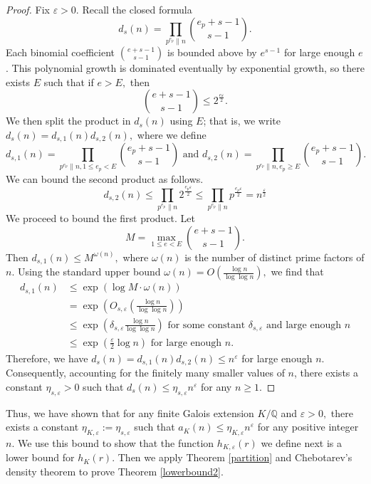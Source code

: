 \documentclass[12pt]{amsart}
\theoremstyle{definition}
\numberwithin{equation}{section}
\newcommand{\Q}{\mathbb{Q}}
\begin{document}
\begin{proof}
    Fix $\varepsilon > 0.$ Recall the closed formula $$d_s(n) = \prod_{p^{e_p} \|n} \binom{e_p+s-1}{s-1}.$$ Each binomial coefficient $\binom{e+s-1}{s-1}$ is bounded above by $e^{s-1}$ for large enough $e$. This polynomial growth is dominated eventually by exponential growth, so there exists $E$ such that if $e > E,$ then $$\binom{e+s-1}{s-1} \leq 2^{\frac{e \varepsilon}{2}}.$$ We then split the product in $d_s(n)$ using $E$; that is, we write $d_s(n) = d_{s,1}(n) d_{s,2}(n),$ where we define $$d_{s,1}(n) = \prod_{p^{e_p} \|n, 1 \leq e_p < E} \binom{e_p+s-1}{s-1} \text{ and }d_{s,2}(n) = \prod_{p^{e_p} \|n, e_p \geq E} \binom{e_p+s-1}{s-1}.$$ We can bound the second product as follows. $$d_{s,2}(n) \leq \prod_{p^{e_p} \| n} 2^\frac{e_p \varepsilon}{2} \leq \prod_{p^{e_p} \| n} p^\frac{e_p \varepsilon}{2} = n^\frac{\varepsilon}{2}$$ We proceed to bound the first product. Let $$M = \max_{1 \leq e < E} \binom{e+s-1}{s-1}.$$ Then $d_{s,1}(n) \leq M^{\omega(n)},$ where $\omega(n)$ is the number of distinct prime factors of $n$. Using the standard upper bound $\omega(n) = O(\frac{\log n}{\log \log n}),$ we find that 
    \begin{align*}
        d_{s,1}(n) & \leq \exp(\log M \cdot \omega(n)) \\
        &= \exp\left( O_{s, \varepsilon} \left( \frac{\log n}{\log \log n}\right)\right) \\
        &\leq \exp\left( \delta_{s, \varepsilon} \frac{\log n}{\log \log n}\right) \text{ for some constant $\delta_{s,\varepsilon}$ and large enough }n \\
        &\leq \exp\left( \frac{\varepsilon}{2} \log n \right)\text{ for large enough }n.
    \end{align*} Therefore, we have $d_s(n)  = d_{s,1}(n) d_{s,2}(n) \leq n^\varepsilon$ for large enough $n$. Consequently, accounting for the finitely many smaller values of $n$, there exists a constant $\eta_{s, \varepsilon} > 0$ such that $d_s(n) \leq \eta_{s, \varepsilon} n^\varepsilon$ for any $n \geq 1.$
\end{proof}

Thus, we have shown that for any finite Galois extension $K/\Q$ and $\varepsilon > 0,$ there exists a constant $\eta_{K, \varepsilon} := \eta_{s,\varepsilon}$ such that $a_K(n) \leq \eta_{K, \varepsilon} n^\varepsilon$ for any positive integer $n$. We use this bound to show that the function $h_{K, \varepsilon}(r)$ we define next is a lower bound for $h_K(r)$. Then we apply Theorem \ref{partition} and Chebotarev's density theorem  to prove Theorem \ref{lowerbound2}. 
\end{document}

